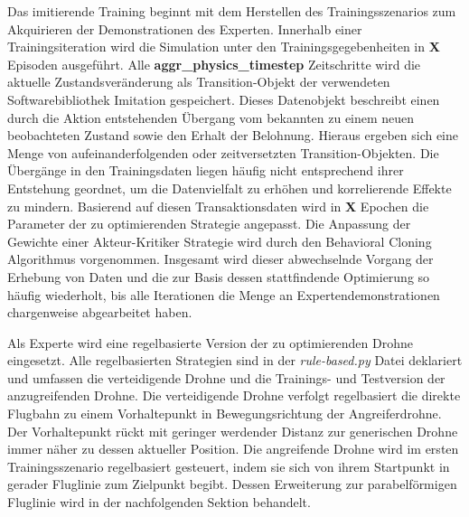 Das imitierende Training beginnt mit dem Herstellen des Trainingsszenarios zum Akquirieren der Demonstrationen des Experten. 
Innerhalb einer Trainingsiteration wird die Simulation unter den Trainingsgegebenheiten in \textbf{X} Episoden ausgeführt.
Alle \textbf{aggr\_physics\_timestep} Zeitschritte wird die aktuelle Zustandsveränderung als Transition-Objekt der verwendeten Softwarebibliothek Imitation gespeichert.
Dieses Datenobjekt beschreibt einen durch die Aktion entstehenden Übergang vom bekannten zu einem neuen beobachteten Zustand sowie den Erhalt der Belohnung.
Hieraus ergeben sich eine Menge von aufeinanderfolgenden oder zeitversetzten Transition-Objekten.
Die Übergänge in den Trainingsdaten liegen häufig nicht entsprechend ihrer Entstehung geordnet, um die Datenvielfalt zu erhöhen und korrelierende Effekte zu mindern. 
Basierend auf diesen Transaktionsdaten wird in \textbf{X} Epochen die Parameter der zu optimierenden Strategie angepasst.
Die Anpassung der Gewichte einer Akteur-Kritiker Strategie wird durch den Behavioral Cloning Algorithmus vorgenommen.
Insgesamt wird dieser abwechselnde Vorgang der Erhebung von Daten und die zur Basis dessen stattfindende Optimierung so häufig wiederholt, bis alle Iterationen die Menge an Expertendemonstrationen chargenweise abgearbeitet haben.

Als Experte wird eine regelbasierte Version der zu optimierenden Drohne eingesetzt. 
Alle regelbasierten Strategien sind in der \textit{rule-based.py} Datei deklariert und umfassen die verteidigende Drohne und die Trainings- und Testversion der anzugreifenden Drohne.
Die verteidigende Drohne verfolgt regelbasiert die direkte Flugbahn zu einem Vorhaltepunkt in Bewegungsrichtung der Angreiferdrohne.
Der Vorhaltepunkt rückt mit geringer werdender Distanz zur generischen Drohne immer näher zu dessen aktueller Position.
Die angreifende Drohne wird im ersten Trainingsszenario regelbasiert gesteuert, indem sie sich von ihrem Startpunkt in gerader Fluglinie zum Zielpunkt begibt.
Dessen Erweiterung zur parabelförmigen Fluglinie wird in der nachfolgenden Sektion behandelt. 

